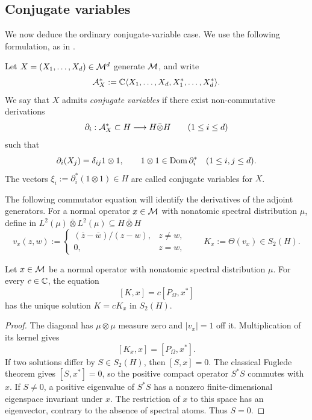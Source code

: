 \subsection{Conjugate variables}\label{subsec:ordinary-conjugates}

We now deduce the ordinary conjugate-variable case.
We use the following formulation, as in \cite[Proposition~3.5]{ACSY24}.

\begin{definition}\label{def:conjugate-variables}
Let $X=(X_1,\ldots,X_d)\in\mathcal M^d$ generate $\mathcal M$, and write
\[
 \mathcal A_X^\ast:=\mathbb C\langle X_1,\ldots,X_d,X_1^*,\ldots,X_d^*\rangle.
\]
We say that $X$ admits \emph{conjugate variables} if there exist non-commutative derivations
\[
 \partial_i:\mathcal A_X^\ast\subset H\longrightarrow H\bar\otimes H
 \qquad(1\leq i\leq d)
\]
such that
\begin{equation}
 \partial_i(X_j)=\delta_{ij}1\otimes1,\qquad
 1\otimes1\in\operatorname{Dom}\partial_i^*
 \quad(1\leq i,j\leq d).
 \label{eq:normal-conjugate-condition}
\end{equation}
The vectors $\xi_i:=\partial_i^*(1\otimes1)\in H$ are called conjugate variables for $X$.
\end{definition}

The following commutator equation will identify the derivatives of the adjoint generators.
For a normal operator $x\in\mathcal M$ with nonatomic spectral distribution $\mu$, define in $L^2(\mu)\bar\otimes L^2(\mu)\subseteq H\bar\otimes H$
\begin{equation}\label{eq:normal-phase-kernel}
 v_x(z,w):=
 \begin{cases}
  (\bar z-\bar w)/(z-w),&z\ne w,\\
  0,&z=w,
 \end{cases}
 \qquad K_x:=\Theta(v_x)\in S_2(H).
\end{equation}

\begin{lemma}\label{lem:normal-adjoint-uniqueness}
Let $x\in\mathcal M$ be a normal operator with nonatomic spectral distribution $\mu$.
For every $c\in\mathbb C$, the equation
\[
 [K,x]=c[P_\Omega,x^*]
\]
has the unique solution $K=cK_x$ in $S_2(H)$.
\end{lemma}
\begin{proof}
The diagonal has $\mu\otimes\mu$ measure zero and $|v_x|=1$ off it.
Multiplication of its kernel gives
\[
 [K_x,x]=[P_\Omega,x^*].
\]
If two solutions differ by $S\in S_2(H)$, then $[S,x]=0$.
The classical Fuglede theorem gives $[S,x^*]=0$, so the positive compact operator $S^*S$ commutes with $x$.
If $S\ne0$, a positive eigenvalue of $S^*S$ has a nonzero finite-dimensional eigenspace invariant under $x$.
The restriction of $x$ to this space has an eigenvector, contrary to the absence of spectral atoms.
Thus $S=0$.
\end{proof}

